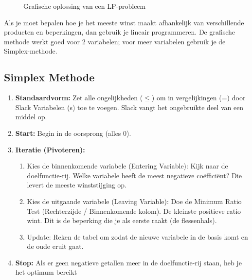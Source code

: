 \documentclass[a4paper,11pt]{article}
\begin{document}
\begin{figure}[ht]
\begin{minipage}{0.5\textwidth}
        \caption{Grafische oplossing van een LP-probleem}
        \label{fig:lp_graph}
    \end{minipage}
\end{figure}

Als je moet bepalen hoe je het meeste winst
 maakt afhankelijk van verschillende producten en beperkingen, 
 dan gebruik je lineair programmeren. De grafische methode werkt goed voor 2 variabelen;
 voor meer variabelen gebruik je de Simplex-methode.

 \subsection{Simplex Methode}

\begin{enumerate}
    \item \textbf{Standaardvorm:} Zet alle ongelijkheden ($\leq$) om in vergelijkingen (=) door Slack Variabelen (s) toe te voegen. 
    Slack vangt het ongebruikte deel van een middel op.
    \item \textbf{Start:} Begin in de oorsprong (alles 0).
    \item \textbf{Iteratie (Pivoteren):}
    \begin{enumerate}
        \item Kies de binnenkomende variabele (Entering Variable): Kijk naar de doelfunctie-rij. Welke variabele heeft de meest negatieve coëfficiënt? Die levert de meeste winststijging op.
        \item Kies de uitgaande variabele (Leaving Variable): Doe de Minimum Ratio Test (Rechterzijde / Binnenkomende kolom). De kleinste positieve ratio wint. Dit is de beperking die je als eerste raakt (de flessenhals).
        \item Update: Reken de tabel om zodat de nieuwe variabele in de basis komt en de oude eruit gaat.
    \end{enumerate}
    \item \textbf{Stop:} Als er geen negatieve getallen meer in de doelfunctie-rij staan, heb je het optimum bereikt
\end{enumerate}
\end{document}

